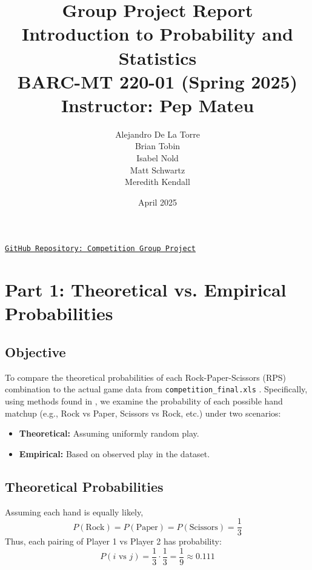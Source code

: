 \documentclass[12pt]{article}
\title{\textbf{Group Project Report}\\
\large Introduction to Probability and Statistics\\
BARC-MT 220-01 (Spring 2025)\\
Instructor: Pep Mateu}
\author{
    Alejandro De La Torre \\
    Brian Tobin \\
    Isabel Nold \\
    Matt Schwartz \\
    Meredith Kendall
}
\date{April 2025}
\begin{document}
\maketitle
\vspace{0.5em}
\begin{center}
\href{https://github.com/adelatorre2/adelatorre2-competition-group-project-mt220}{\texttt{GitHub Repository: Competition Group Project}}
\end{center}
\vspace{0.5em}

\vspace{0.5em}

\newpage
\tableofcontents
\newpage

\section*{Part 1: Theoretical vs. Empirical Probabilities}

\subsection*{Objective}
To compare the theoretical probabilities of each Rock-Paper-Scissors (RPS) combination to the actual game data from \texttt{competition\_final.xls} \cite{mateu_competition_lastxlsx_2025}. Specifically, using methods found in \cite{montgomery_applied_2018}, we examine the probability of each possible hand matchup (e.g., Rock vs Paper, Scissors vs Rock, etc.) under two scenarios:
\begin{itemize}
    \item \textbf{Theoretical:} Assuming uniformly random play.
    \item \textbf{Empirical:} Based on observed play in the dataset.
\end{itemize}

\subsection*{Theoretical Probabilities}
Assuming each hand is equally likely,
\[
P(\text{Rock}) = P(\text{Paper}) = P(\text{Scissors}) = \frac{1}{3}
\]
Thus, each pairing of Player 1 vs Player 2 has probability:
\[
P(i \text{ vs } j) = \frac{1}{3} \cdot \frac{1}{3} = \frac{1}{9} \approx 0.111
\]
\end{document}
